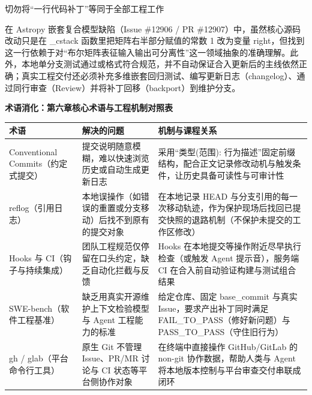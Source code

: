 \documentclass[UTF8,a4paper,11pt,fontset=fandol]{ctexart}
\begin{document}
\begin{warningbox}{切勿将“一行代码补丁”等同于全部工程工作}

在 Astropy 嵌套复合模型缺陷（Issue \#12906 / PR \#12907）中，虽然核心源码改动只是在 \_cstack 函数里把矩阵右半部分赋值的常数 1 改为变量 right，但找到这一行依赖于对“布尔矩阵表征输入输出可分离性”这一领域抽象的准确理解。此外，本地单分支测试通过或格式符合规范，并不自动保证合入更新后的主线依然正确；真实工程交付还必须补充多维嵌套回归测试、编写更新日志（changelog）、通过同行审查（Review）并将补丁回移（backport）到维护分支。

\end{warningbox}

\par{}\textbf{术语消化：第六章核心术语与工程机制对照表}

\begin{center}\small\begin{tabularx}{\linewidth}{YYY}

\toprule

术语 & 解决的问题 & 机制与课程关系\\\midrule

Conventional Commits（约定式提交） & 提交说明随意模糊，难以快速浏览历史或自动生成更新日志 & 采用“类型(范围): 行为描述”固定前缀结构，配合正文记录修改动机与触发条件，让历史具备可读性与可审计性\\[3pt]

reflog（引用日志） & 本地误操作（如错误的重置或分支移动）后找不到原有的提交对象 & 在本地记录 HEAD 与分支引用的每一次移动轨迹，作为保护现场后找回已提交快照的退路机制（不保护未提交的工作区修改）\\[3pt]

Hooks 与 CI（钩子与持续集成） & 团队工程规范仅停留在口头约定，缺乏自动化拦截与反馈 & Hooks 在本地提交等操作附近尽早执行检查（或触发 Agent 提示音），服务端 CI 在合入前自动验证构建与测试组合结果\\[3pt]

SWE-bench（软件工程基准） & 缺乏用真实开源维护上下文检验模型与 Agent 工程能力的标准 & 给定仓库、固定 base\_commit 与真实 Issue，要求产出补丁同时满足 FAIL\_TO\_PASS（修好新问题）与 PASS\_TO\_PASS（守住旧行为）\\[3pt]

gh / glab（平台命令行工具） & 原生 Git 不管理 Issue、PR/MR 讨论与 CI 状态等平台侧协作对象 & 在终端中直接操作 GitHub/GitLab 的 non-git 协作数据，帮助人类与 Agent 将本地版本控制与平台审查交付串联成闭环\\[3pt]

\bottomrule\end{tabularx}\end{center}
\end{document}
